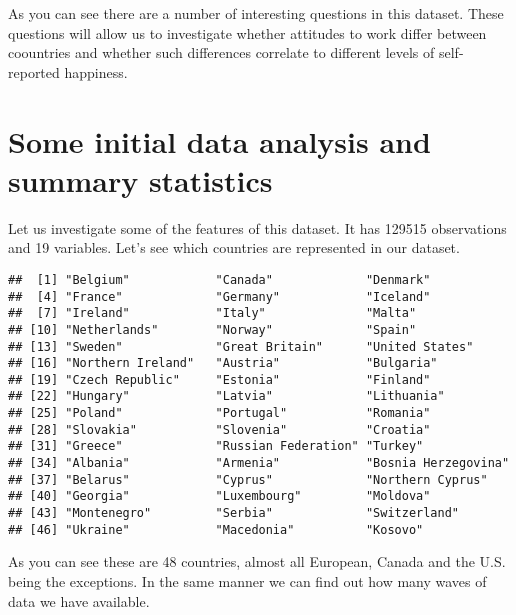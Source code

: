 \documentclass[]{article}
\newenvironment{Shaded}{\begin{snugshade}}{\end{snugshade}}
\newcommand{\KeywordTok}[1]{\textcolor[rgb]{0.13,0.29,0.53}{\textbf{#1}}}
\newcommand{\CommentTok}[1]{\textcolor[rgb]{0.56,0.35,0.01}{\textit{#1}}}
\newcommand{\OperatorTok}[1]{\textcolor[rgb]{0.81,0.36,0.00}{\textbf{#1}}}
\newcommand{\NormalTok}[1]{#1}
\begin{document}
As you can see there are a number of interesting questions in this
dataset. These questions will allow us to investigate whether attitudes
to work differ between coountries and whether such differences correlate
to different levels of self-reported happiness.

\section{Some initial data analysis and summary
statistics}\label{some-initial-data-analysis-and-summary-statistics}

Let us investigate some of the features of this dataset. It has 129515
observations and 19 variables. Let's see which countries are represented
in our dataset.

\begin{Shaded}
\end{Shaded}

\begin{verbatim}
##  [1] "Belgium"            "Canada"             "Denmark"           
##  [4] "France"             "Germany"            "Iceland"           
##  [7] "Ireland"            "Italy"              "Malta"             
## [10] "Netherlands"        "Norway"             "Spain"             
## [13] "Sweden"             "Great Britain"      "United States"     
## [16] "Northern Ireland"   "Austria"            "Bulgaria"          
## [19] "Czech Republic"     "Estonia"            "Finland"           
## [22] "Hungary"            "Latvia"             "Lithuania"         
## [25] "Poland"             "Portugal"           "Romania"           
## [28] "Slovakia"           "Slovenia"           "Croatia"           
## [31] "Greece"             "Russian Federation" "Turkey"            
## [34] "Albania"            "Armenia"            "Bosnia Herzegovina"
## [37] "Belarus"            "Cyprus"             "Northern Cyprus"   
## [40] "Georgia"            "Luxembourg"         "Moldova"           
## [43] "Montenegro"         "Serbia"             "Switzerland"       
## [46] "Ukraine"            "Macedonia"          "Kosovo"
\end{verbatim}

As you can see these are 48 countries, almost all European, Canada and
the U.S. being the exceptions. In the same manner we can find out how
many waves of data we have available.
\end{document}
